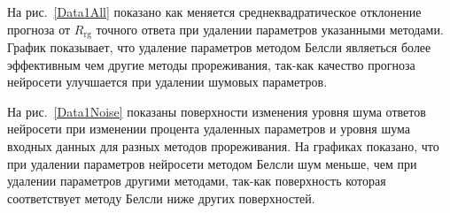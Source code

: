 На рис.~\ref{Data1All} показано как меняется среднеквадратическое отклонение прогноза от $R_{\text{rg}}$ точного ответа при удалении параметров указанными методами. График показывает, что удаление параметров методом Белсли являеться более эффективным чем другие методы прореживания, так-как качество прогноза нейросети улучшается при удалении шумовых параметров.

На рис.~\ref{Data1Noise} показаны поверхности изменения уровня шума ответов нейросети при изменении процента удаленных параметров и уровня шума входных данных для разных методов прореживания. На графиках показано, что при удалении параметров нейросети методом Белсли шум меньше, чем при удалении параметров другими методами, так-как поверхность которая соответствует методу Белсли ниже других поверхностей.

